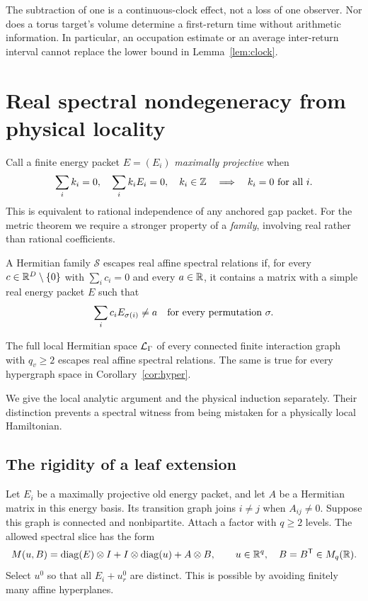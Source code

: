 The subtraction of one is a continuous-clock effect, not a loss of one
observer. Nor does a torus target's volume determine a first-return
time without arithmetic information. In particular, an occupation
estimate or an average inter-return interval cannot replace the lower
bound in Lemma~\ref{lem:clock}.

\section{Real spectral nondegeneracy from physical locality}

Call a finite energy packet $E=(E_i)$ \emph{maximally projective} when
\[
 \sum_i k_i=0,\quad \sum_i k_iE_i=0,\quad k_i\in\mathbb Z
       \quad\Longrightarrow\quad k_i=0\text{ for all }i.
\]
This is equivalent to rational independence of any anchored gap packet.
For the metric theorem we require a stronger property of a
\emph{family}, involving real rather than rational coefficients.

\begin{definition}
A Hermitian family $\mathcal S$ escapes real affine spectral relations
if, for every $c\in\mathbb R^D\setminus\{0\}$ with $\sum_i c_i=0$ and every
$a\in\mathbb R$, it contains a matrix with a simple real energy packet $E$ such
that
\begin{equation}
 \sum_i c_i E_{\sigma(i)}\ne a
          \quad\hbox{for every permutation }\sigma.
 \label{eq:escape}
\end{equation}
\end{definition}

\begin{theorem}\label{thm:escape}
The full local Hermitian space $\mathcal L_\Gamma$ of every connected finite
interaction graph with $q_v\geq2$ escapes real affine spectral
relations. The same is true for every hypergraph space in
Corollary~\ref{cor:hyper}.
\end{theorem}

We give the local analytic argument and the physical induction
separately. Their distinction prevents a spectral witness from being
mistaken for a physically local Hamiltonian.

\subsection{The rigidity of a leaf extension}

Let $E_i$ be a maximally projective old energy packet, and let $A$ be a
Hermitian matrix in this energy basis. Its transition graph joins
$i\ne j$ when $A_{ij}\ne0$. Suppose this graph is connected and
nonbipartite. Attach a factor with $q\geq2$ levels. The allowed spectral
slice has the form
\begin{equation}
 M(u,B)=\operatorname{diag}(E)\otimes I+
          I\otimes\operatorname{diag}(u)+A\otimes B,
 \qquad u\in\mathbb R^q,\quad B=B^{\mathsf T}\in M_q(\mathbb R).
 \label{eq:leaf}
\end{equation}
Select $u^0$ so that all $E_i+u^0_r$ are distinct. This is possible by
avoiding finitely many affine hyperplanes.

